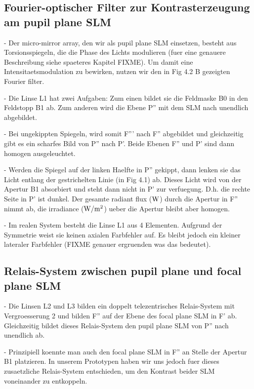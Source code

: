 \subsection{ Fourier-optischer Filter zur Kontrasterzeugung am pupil plane SLM}
  - Der micro-mirror array, den wir als pupil plane SLM einsetzen,        %
    besteht aus Torsionsspiegeln, die die Phase des Lichts modulieren
    (fuer eine genauere Beschreibung siehe spaeteres Kapitel               
    FIXME). Um damit eine Intensitaetsmodulation zu bewirken, nutzen
    wir den in Fig 4.2 B gezeigten Fourier filter. 

  - Die Linse L1 hat zwei Aufgaben: Zum einen bildet sie die Feldmaske   %
    B0 in den Feldstopp B1 ab. Zum anderen wird die Ebene P'' mit dem
    SLM nach unendlich abgebildet.

  - Bei ungekippten Spiegeln, wird somit F''' nach F'' abgebildet und    %
    gleichzeitig gibt es ein scharfes Bild von P'' nach P'. Beide
    Ebenen F'' und P' sind dann homogen ausgeleuchtet.

  - Werden die Spiegel auf der linken Haelfte in P'' gekippt, dann
    lenken sie das Licht entlang der gestrichelten Linie (in Fig 4.1)
    ab. Dieses Licht wird von der Apertur B1 absorbiert und steht dann
    nicht in P' zur verfuegung. D.h. die rechte Seite in P' ist
    dunkel. Der gesamte radiant flux ($\unit[]{W}$) durch die Apertur in
    F'' nimmt ab, die irradiance ($\unit[]{W/m^2}$) ueber die Apertur
    bleibt aber homogen.

  - Im realen System besteht die Linse L1 aus 4 Elementen. Aufgrund
    der Symmetrie weist sie keinen axialen Farbfehler auf. Es bleibt
    jedoch ein kleiner lateraler Farbfehler (FIXME genauer ergruenden
    was das bedeutet).
 

\subsection{ Relais-System zwischen pupil plane und focal plane SLM}
  - Die Linsen L2 und L3 bilden ein doppelt telezentrisches             %
    Relais-System mit Vergroesserung 2 und bilden F'' auf der Ebene
    des focal plane SLM in F' ab. Gleichzeitig bildet dieses
    Relais-System den pupil plane SLM von P'' nach unendlich ab.
 
  - Prinzipiell koennte man auch den focal plane SLM in F'' an Stelle
    der Apertur B1 platzieren. In unserem Prototypen haben wir uns
    jedoch fuer dieses zusaetzliche Relais-System entschieden, um den
    Kontrast beider SLM voneinander zu entkoppeln.


